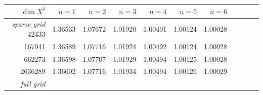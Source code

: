 \documentclass[11pt,a4paper,oneside,english]{amsart}
\numberwithin{equation}{section}
\numberwithin{theorem}{section}
\theoremstyle{definition}
\begin{document}
\begin{table}
  \begin{tabular}{rrrrrrrrrrr}\toprule
    $\dim X^\delta$ & $n=1$ & $n=2$ & $n=3$ & $n=4$ & $n=5$  & $n=6$\\\midrule
    \emph{sparse grid} \quad
    42433  & 1.36533  & 1.07672  & 1.01920  & 1.00491  & 1.00124 & 1.00028 \\
    167041 & 1.36589  & 1.07716  & 1.01924  & 1.00492  & 1.00124 & 1.00028 \\
    662273 & 1.36598  & 1.07707  & 1.01929  & 1.00494  & 1.00125 & 1.00028 \\
    2636289 & 1.36602  & 1.07716  & 1.01934  & 1.00494  & 1.00126 & 1.00029 \\
    \midrule
    \emph{full grid} \quad

\end{tabular}
\end{table}
\end{document}
